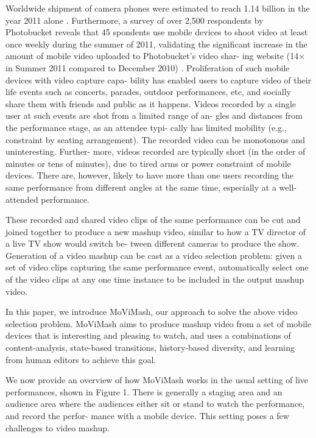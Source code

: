 \documentclass{sig-alternate}
\begin{document}
Worldwide shipment of camera phones were estimated to reach
1.14 billion in the year 2011 alone \cite{saini2012movimash}. Furthermore, a survey of
over 2,500 respondents by Photobucket reveals that 45%
spondents use mobile devices to shoot video at least once weekly during the summer of 2011, validating the significant increase in
the amount of mobile video uploaded to Photobucket’s video shar-
ing website (14× in Summer 2011 compared to December 2010) \cite{saini2012movimash}.
Proliferation of such mobile devices with video capture capa-
bility has enabled users to capture video of their life events such
as concerts, parades, outdoor performances, etc, and socially share
them with friends and public as it happens. Videos recorded by
a single user at such events are shot from a limited range of an-
gles and distances from the performance stage, as an attendee typi-
cally has limited mobility (e.g., constraint by seating arrangement).
The recorded video can be monotonous and uninteresting. Further-
more, videos recorded are typically short (in the order of minutes
or tens of minutes), due to tired arms or power constraint of mobile
devices. There are, however, likely to have more than one users
recording the same performance from different angles at the same
time, especially at a well-attended performance.

These recorded and shared video clips of the same performance
can be cut and joined together to produce a new mashup video,
similar to how a TV director of a live TV show would switch be-
tween different cameras to produce the show. Generation of a video
mashup can be cast as a video selection problem: given a set of
video clips capturing the same performance event, automatically
select one of the video clips at any one time instance to be included
in the output mashup video.

In this paper, we introduce MoViMash, our approach to solve
the above video selection problem. MoViMash aims to produce
mashup video from a set of mobile devices that is interesting and
pleasing to watch, and uses a combinations of content-analysis,
state-based transitions, history-based diversity, and learning from
human editors to achieve this goal.

We now provide an overview of how MoViMash works in the
usual setting of live performances, shown in Figure 1. There is
generally a staging area and an audience area where the audiences
either sit or stand to watch the performance, and record the perfor-
mance with a mobile device. This setting poses a few challenges to
video mashup.
\end{document}
